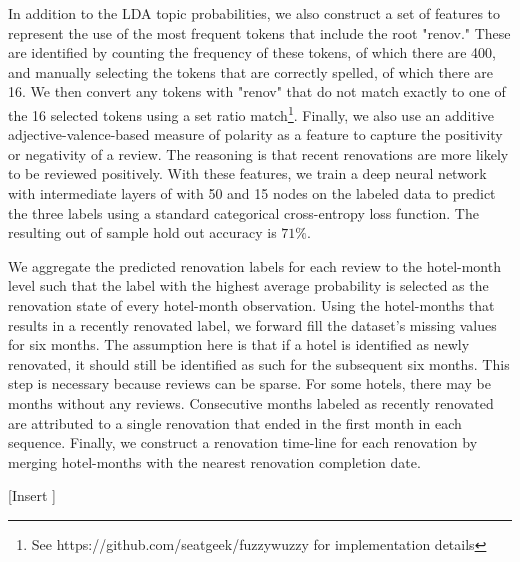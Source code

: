 \documentclass[mksc,blindrev]{informs3} %
\begin{document}
In addition to the LDA topic probabilities, we also construct a set of features to represent the use of the most frequent tokens that include the root "renov." These are identified by counting the frequency of these tokens, of which there are 400, and manually selecting the tokens that are correctly spelled, of which there are 16. We then convert any tokens with "renov" that do not match exactly to one of the 16 selected tokens using a set ratio match\footnote{See https://github.com/seatgeek/fuzzywuzzy for implementation details}. Finally, we also use an additive adjective-valence-based measure of polarity as a feature to capture the positivity or negativity of a review. The reasoning is that recent renovations are more likely to be reviewed positively. With these features, we train a deep neural network with intermediate layers of with 50 and 15 nodes on the labeled data to predict the three labels using a standard categorical cross-entropy loss function. The resulting out of sample hold out accuracy is $71\%$. 

We aggregate the predicted renovation labels for each review to the hotel-month level such that the label with the highest average probability is selected as the renovation state of every hotel-month observation. Using the hotel-months that results in a recently renovated label, we forward fill the dataset's missing values for six months. The assumption here is that if a hotel is identified as newly renovated, it should still be identified as such for the subsequent six months. This step is necessary because reviews can be sparse. For some hotels, there may be months without any reviews. Consecutive months labeled as recently renovated are attributed to a single renovation that ended in the first month in each sequence. Finally, we construct a renovation time-line for each renovation by merging hotel-months with the nearest renovation completion date. 

[Insert ]
\end{document}
